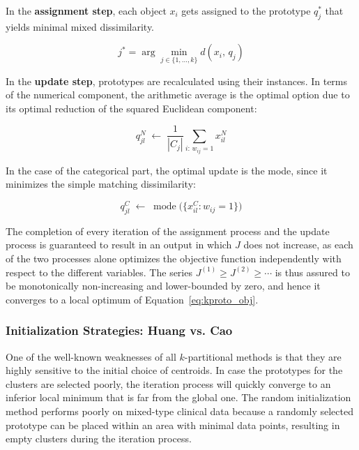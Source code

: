 \vspace{0.5em}

In the \textbf{assignment step}, each object $x_i$ gets assigned to the prototype $q_j^*$ that yields minimal mixed dissimilarity.

\begin{equation}
    j^* = \arg\min_{j \in \{1,\ldots,k\}} d(x_i,\, q_j)
\end{equation}

In the \textbf{update step}, prototypes are recalculated using their instances. In terms of the numerical component, the arithmetic average is the optimal option due to its optimal reduction of the squared Euclidean component:

\begin{equation}
    q_{jl}^{N} \;\leftarrow\; \frac{1}{|C_j|}\sum_{i:\, w_{ij}=1} x_{il}^{N}
\end{equation}

In the case of the categorical part, the optimal update is the mode, since it minimizes the simple matching dissimilarity:

\begin{equation}
    q_{jl}^{C} \;\leftarrow\; \operatorname{mode}\bigl(\{x_{il}^{C} : w_{ij} = 1\}\bigr)
\end{equation}

The completion of every iteration of the assignment process and the update process is guaranteed to result in an output in which $J$ does not increase, as each of the two processes alone optimizes the objective function independently with respect to the different variables. The series $J^{(1)} \geq J^{(2)} \geq \cdots$ is thus assured to be monotonically non-increasing and lower-bounded by zero, and hence it converges to a local optimum of Equation~\eqref{eq:kproto_obj}.

\subsubsection*{Initialization Strategies: Huang vs. Cao}

One of the well-known weaknesses of all $k$-partitional methods is that they are highly sensitive to the initial choice of centroids. In case the prototypes for the clusters are selected poorly, the iteration process will quickly converge to an inferior local minimum that is far from the global one. The random initialization method performs poorly on mixed-type clinical data because a randomly selected prototype can be placed within an area with minimal data points, resulting in empty clusters during the iteration process.

